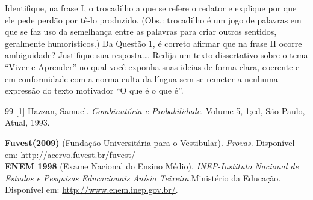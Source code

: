 \documentclass[12pt]{exam}
\renewcommand*\half{.5}
\begin{document}
\begin{questions}
Identifique, na frase I, o trocadilho a que se refere o redator e explique por que ele pede perdão por tê-lo produzido. (Obs.: trocadilho é um jogo de palavras em que se faz uso da semelhança entre as palavras para criar outros sentidos, geralmente humorísticos.)
\makeemptybox{2in}
\addpoints
\question[3]\cite{Fuvest(2009)} Da Questão 1, é correto afirmar que na frase II ocorre ambiguidade? Justifique sua resposta.\ldots
\fillwithlines{\fill}
\newpage
\question[1\half]\citep{ENEM(1998)}
Redija um texto dissertativo sobre o tema “Viver e Aprender” no qual você exponha suas ideias de forma clara, coerente e em conformidade com a norma culta da língua sem se remeter a nenhuma expressão do texto motivador “O que é o que é”. 
		
\fillwithdottedlines{\fill}%
		
\end{questions}
\begin{thebibliography}{99}
\thispagestyle{empty}%
[1] {Hazzan, Samuel}.
\emph{Combinatória e Probabilidade}.
{Volume  5}, {1;ed}, {São Paulo}, {Atual}, {1993}.
		
\textbf{Fuvest(2009)}
(Fundação Universitária para o Vestibular).
\emph{Provas}. 
Disponível em:
\url{http://acervo.fuvest.br/fuvest/}\\
		
\textbf{ENEM 1998}
(Exame Nacional do Ensino Médio).
\emph{INEP-Instituto Nacional de Estudos e Pesquisas Educacionais Anísio Teixeira}.{Ministério da Educação}. 
Disponível em:
\url{http://www.enem.inep.gov.br/}.
		
\end{thebibliography}
\end{document}

